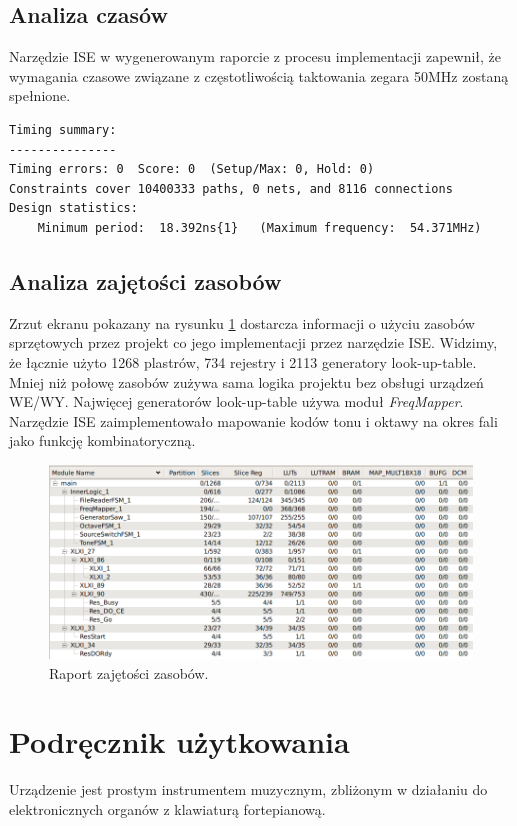 \documentclass[a4paper,12pt]{article}
\begin{document}
\subsection{Analiza czasów}
Narzędzie ISE w wygenerowanym raporcie z procesu implementacji zapewnił, że wymagania czasowe związane z częstotliwością taktowania zegara 50MHz zostaną spełnione.
\begin{lstlisting}
Timing summary: 
--------------- 
Timing errors: 0  Score: 0  (Setup/Max: 0, Hold: 0) 
Constraints cover 10400333 paths, 0 nets, and 8116 connections 
Design statistics: 
    Minimum period:  18.392ns{1}   (Maximum frequency:  54.371MHz) 
\end{lstlisting}



\subsection{Analiza zajętości zasobów}

Zrzut ekranu pokazany na rysunku \ref{hardware} dostarcza informacji o użyciu zasobów sprzętowych przez projekt co jego implementacji przez narzędzie ISE. Widzimy, że łącznie użyto 1268 plastrów, 734 rejestry i 2113 generatory look-up-table. Mniej niż połowę zasobów zużywa sama logika projektu bez obsługi urządzeń WE/WY. Najwięcej generatorów look-up-table używa moduł \textit{FreqMapper}. Narzędzie ISE zaimplementowało mapowanie kodów tonu i oktawy na okres fali jako funkcję kombinatoryczną.

\begin{figure}[h]
  \centering
  \includegraphics[width=\linewidth]{images/area}
  \caption{Raport zajętości zasobów.}
  \label{hardware}
\end{figure}

\clearpage
\section{Podręcznik użytkowania}
Urządzenie jest prostym instrumentem muzycznym, zbliżonym w działaniu do elektronicznych organów z klawiaturą fortepianową.
\end{document}
